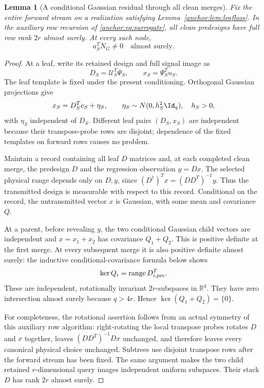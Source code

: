 \documentclass[11pt,oneside,openany,a4paper]{book}
\numberwithin{equation}{chapter}
\newtheorem{lemma}[theorem]{Lemma}
\theoremstyle{definition}
\theoremstyle{remark}
\newcommand{\R}{\mathbb R}\newcommand{\E}{\mathbb E}\newcommand{\Prb}{\mathbb P}\newcommand{\PP}{\mathbb P}
\DeclareMathOperator{\ran}{range}\DeclareMathOperator{\OPT}{OPT}
\begin{document}
\begin{lemma}[A conditional Gaussian residual through all clean merges]\label{anchor:lem:residual}
Fix the entire forward stream on a realization satisfying Lemma~\ref{anchor:lem:leafloss}. In the auxiliary row recursion of \eqref{anchor:eq:surrogate}, all clean predesigns have full row rank $2r$ almost surely. At every such node,
\begin{equation}\label{anchor:eq:nonzero-return}
 a_S^TN_G\ne0\quad\text{almost surely}.
\end{equation}
\end{lemma}
\begin{proof}
At a leaf, write its retained design and full signal image as
\[
 D_S=\mathcal U_S^T\Psi_S,\qquad x_S=\Psi_S^Tu_S.
\]
The leaf template is fixed under the present conditioning. Orthogonal Gaussian projections give
\[
 x_S=D_S^Tc_S+\eta_S,\qquad
 \eta_S\sim N(0,h_S^2\Id_q),\quad h_S>0,
\]
with $\eta_S$ independent of $D_S$. Different leaf pairs $(D_S,x_S)$ are independent because their transpose-probe rows are disjoint; dependence of the fixed templates on forward rows causes no problem.

Maintain a record containing all leaf $D$ matrices and, at each completed clean merge, the predesign $D$ and the regression observation $y=Dx$. The selected physical range depends only on $D,y$, since $(D^\dagger)^Tx=(DD^T)^{-1}y$. Thus the transmitted design is measurable with respect to this record. Conditional on the record, the untransmitted vector $x$ is Gaussian, with some mean and covariance $Q$.

At a parent, before revealing $y$, the two conditional Gaussian child vectors are independent and $x=x_1+x_2$ has covariance $Q_1+Q_2$. This is positive definite at the first merge. At every subsequent merge it is also positive definite almost surely: the inductive conditional-covariance formula below shows
\[
 \ker Q_i=\ran D_{i,\rm pre}^T.
\]
These are independent, rotationally invariant $2r$-subspaces in $\R^q$. They have zero intersection almost surely because $q>4r$. Hence $\ker(Q_1+Q_2)=\{0\}$.

For completeness, the rotational assertion follows from an actual symmetry of this auxiliary row algorithm: right-rotating the local transpose probes rotates $D$ and $x$ together, leaves $(DD^T)^{-1}Dx$ unchanged, and therefore leaves every canonical physical choice unchanged. Subtrees use disjoint transpose rows after the forward stream has been fixed. The same argument makes the two child retained $r$-dimensional query images independent uniform subspaces. Their stack $D$ has rank $2r$ almost surely.


\end{proof}
\end{document}
